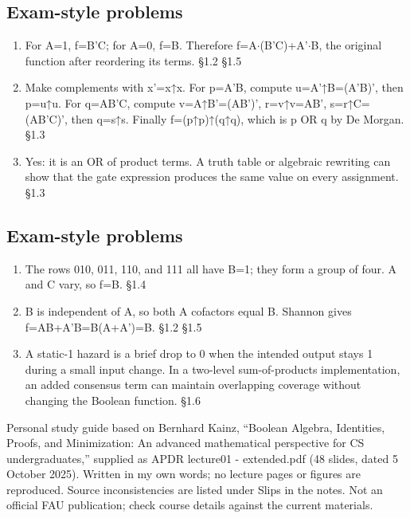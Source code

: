 \documentclass[11pt]{article}
\begin{document}
\begin{keepsection}\subsection{Exam-style problems}

\begin{enumerate}
\item For A=1, f=B'C; for A=0, f=B. Therefore f=A\ensuremath{\cdot}(B'C)+A'\ensuremath{\cdot}B, the original function after reordering its terms. \hfill{\small\color{FAUblue}§1.2} \hfill{\small\color{FAUblue}§1.5}
\item Make complements with x'=x↑x. For p=A'B, compute u=A'↑B=(A'B)', then p=u↑u. For q=AB'C, compute v=A↑B'=(AB')', r=v↑v=AB', s=r↑C=(AB'C)', then q=s↑s. Finally f=(p↑p)↑(q↑q), which is p OR q by De Morgan. \hfill{\small\color{FAUblue}§1.3}
\item Yes: it is an OR of product terms. A truth table or algebraic rewriting can show that the gate expression produces the same value on every assignment. \hfill{\small\color{FAUblue}§1.3}
\end{enumerate}

\end{keepsection}
\begin{keepsection}\subsection{Exam-style problems}

\begin{enumerate}
\item The rows 010, 011, 110, and 111 all have B=1; they form a group of four. A and C vary, so f=B. \hfill{\small\color{FAUblue}§1.4}
\item B is independent of A, so both A cofactors equal B. Shannon gives f=AB+A'B=B(A+A')=B. \hfill{\small\color{FAUblue}§1.2} \hfill{\small\color{FAUblue}§1.5}
\item A static-1 hazard is a brief drop to 0 when the intended output stays 1 during a small input change. In a two-level sum-of-products implementation, an added consensus term can maintain overlapping coverage without changing the Boolean function. \hfill{\small\color{FAUblue}§1.6}
\end{enumerate}

\end{keepsection}

\vfill{\small Personal study guide based on Bernhard Kainz, “Boolean Algebra, Identities, Proofs, and Minimization: An advanced mathematical perspective for CS undergraduates,” supplied as APDR lecture01 - extended.pdf (48 slides, dated 5 October 2025). Written in my own words; no lecture pages or figures are reproduced. Source inconsistencies are listed under Slips in the notes. Not an official FAU publication; check course details against the current materials.}
\end{document}
